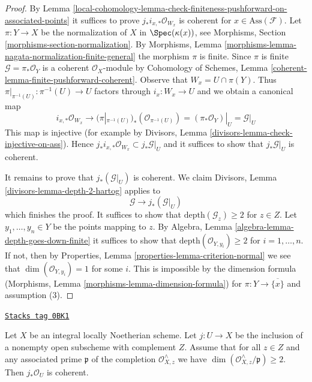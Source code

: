 \begin{proof}
By Lemma \ref{local-cohomology-lemma-check-finiteness-pushforward-on-associated-points}
it suffices to prove $j_*i_{x, *}\mathcal{O}_{W_x}$ is coherent
for $x \in \text{Ass}(\mathcal{F})$.
Let $\pi : Y \to X$ be the normalization of $X$ in $\Spec(\kappa(x))$, see
Morphisms, Section \ref{morphisms-section-normalization}. By
Morphisms, Lemma \ref{morphisms-lemma-nagata-normalization-finite-general}
the morphism $\pi$ is finite. Since $\pi$ is finite
$\mathcal{G} = \pi_*\mathcal{O}_Y$ is a coherent $\mathcal{O}_X$-module by
Cohomology of Schemes, Lemma \ref{coherent-lemma-finite-pushforward-coherent}.
Observe that $W_x = U \cap \pi(Y)$. Thus
$\pi|_{\pi^{-1}(U)} : \pi^{-1}(U) \to U$ factors through $i_x : W_x \to U$
and we obtain a canonical map
$$
i_{x, *}\mathcal{O}_{W_x}
\longrightarrow
(\pi|_{\pi^{-1}(U)})_*(\mathcal{O}_{\pi^{-1}(U)}) =
(\pi_*\mathcal{O}_Y)|_U = \mathcal{G}|_U
$$
This map is injective (for example by Divisors, Lemma
\ref{divisors-lemma-check-injective-on-ass}). Hence
$j_*i_{x, *}\mathcal{O}_{W_x} \subset j_*\mathcal{G}|_U$
and it suffices to show that $j_*\mathcal{G}|_U$ is coherent.

\medskip\noindent
It remains to prove that $j_*(\mathcal{G}|_U)$ is coherent. We claim
Divisors, Lemma \ref{divisors-lemma-depth-2-hartog}
applies to
$$
\mathcal{G} \longrightarrow j_*(\mathcal{G}|_U)
$$
which finishes the proof. It suffices to show that
$\text{depth}(\mathcal{G}_z) \geq 2$ for $z \in Z$.
Let $y_1, \ldots, y_n \in Y$ be the points mapping to $z$.
By Algebra, Lemma \ref{algebra-lemma-depth-goes-down-finite}
it suffices to show that
$\text{depth}(\mathcal{O}_{Y, y_i}) \geq 2$ for $i = 1, \ldots, n$.
If not, then by Properties, Lemma \ref{properties-lemma-criterion-normal}
we see that $\dim(\mathcal{O}_{Y, y_i}) = 1$ for some $i$.
This is impossible by the dimension formula
(Morphisms, Lemma \ref{morphisms-lemma-dimension-formula})
for $\pi : Y \to \overline{\{x\}}$ and assumption (3).
\end{proof}

\begin{lemma}
\label{local-cohomology-lemma-sharp-finiteness-pushforward}
\href{https://stacks.math.columbia.edu/tag/0BK1}{\texttt{Stacks tag 0BK1}}

Let $X$ be an integral locally Noetherian scheme. Let $j : U \to X$
be the inclusion of a nonempty open subscheme with complement $Z$. Assume
that for all $z \in Z$ and any associated prime $\mathfrak p$ of
the completion $\mathcal{O}_{X, z}^\wedge$
we have $\dim(\mathcal{O}_{X, z}^\wedge/\mathfrak p) \geq 2$.
Then $j_*\mathcal{O}_U$ is coherent.
\end{lemma}

